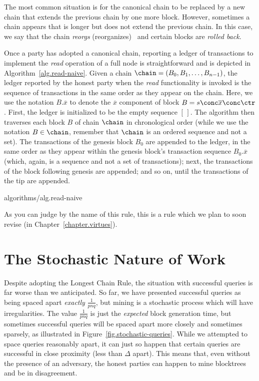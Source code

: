 The most common situation is for the canonical chain to be replaced by a new chain
that extends the previous chain by one more block. However, sometimes a chain appears
that is longer but does not extend the previous chain. In this case, we say that
the chain \emph{reorgs} (reorganizes)~ and certain blocks are \emph{rolled
back}.

Once a party has adopted a canonical chain, reporting a ledger of transactions
to implement the \emph{read} operation of a full node is straightforward and
is depicted in Algorithm~\ref{alg.read-naive}. Given a chain
$\chain = (B_0, B_1, \ldots, B_{n-1})$, the ledger reported by the honest
party when the \emph{read} functionality is invoked is the sequence of
transactions in the same order as they appear on the chain.
Here, we use the notation $B.\overline{x}$ to denote the $\overline{x}$ component
of block $B = s \conc \overline{x} \conc \ctr$.
First, the ledger is initialized to be the empty sequence $[\,]$. The algorithm
then traverses each block $B$ of chain $\chain$ in chronological order (while we
use the notation $B \in \chain$, remember that $\chain$ is an ordered sequence
and not a set). The transactions of the genesis block $B_0$ are appended to the ledger, in the same
order as they appear within the genesis block's transaction sequence $B_0.\overline{x}$
(which, again, is a sequence and not a set of transactions);
next, the transactions of the block following genesis are appended; and so on, until
the transactions of the tip are appended.

{algorithms/alg.read-naive}

As you can judge by the name of this rule, this is a rule which we plan to
soon revise (in Chapter~\ref{chapter.virtues}).

\section{The Stochastic Nature of Work}

Despite adopting the Longest Chain Rule, the situation with successful queries
is far worse than we anticipated.
So far, we have presented successful queries as being
spaced apart \emph{exactly} $\frac{1}{pnq}$, but mining is a stochastic process which will have
irregularities. The value $\frac{1}{pnq}$ is just the \emph{expected} block generation time, but
sometimes successful queries will be spaced apart more closely and sometimes sparsely, as illustrated
in Figure~\ref{fig.stochastic-queries}. While we attempted to space queries reasonably apart, it can
just so happen that certain queries are successful in close proximity (less than $\Delta$ apart).
This means that, even without the presence of an adversary, the honest parties can happen to
mine blocktrees and be in disagreement.

